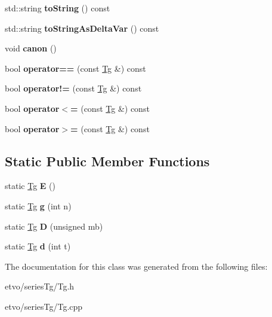\begin{DoxyCompactItemize}
\item 
\mbox{\label{classetvo_i_i_1_1_tg_a056be940039693d2ca1da26bef41edab}} 
std\+::string {\bfseries to\+String} () const
\item 
\mbox{\label{classetvo_i_i_1_1_tg_a8ae7896ab5a4fd55b2581979fd0ba5a6}} 
std\+::string {\bfseries to\+String\+As\+Delta\+Var} () const
\item 
\mbox{\label{classetvo_i_i_1_1_tg_ad65dbfb72f59eb19abf1e185606fab30}} 
void {\bfseries canon} ()
\item 
\mbox{\label{classetvo_i_i_1_1_tg_a9e68ea08fe12077902d71616065a4905}} 
bool {\bfseries operator==} (const \mbox{\hyperlink{classetvo_i_i_1_1_tg}{Tg}} \&) const
\item 
\mbox{\label{classetvo_i_i_1_1_tg_a4bca83b3ff37b22ab84a6715e33e4383}} 
bool {\bfseries operator!=} (const \mbox{\hyperlink{classetvo_i_i_1_1_tg}{Tg}} \&) const
\item 
\mbox{\label{classetvo_i_i_1_1_tg_a39baf99417a03e4d1183a37e099cb504}} 
bool {\bfseries operator$<$=} (const \mbox{\hyperlink{classetvo_i_i_1_1_tg}{Tg}} \&) const
\item 
\mbox{\label{classetvo_i_i_1_1_tg_a556897c515426824b3a99e574179c862}} 
bool {\bfseries operator$>$=} (const \mbox{\hyperlink{classetvo_i_i_1_1_tg}{Tg}} \&) const
\end{DoxyCompactItemize}
\subsection*{Static Public Member Functions}
\begin{DoxyCompactItemize}
\item 
\mbox{\label{classetvo_i_i_1_1_tg_acdeb0254c059e7f140b5fbb3a751eac8}} 
static \mbox{\hyperlink{classetvo_i_i_1_1_tg}{Tg}} {\bfseries E} ()
\item 
\mbox{\label{classetvo_i_i_1_1_tg_a5db928beb3ea725ed6a444d46805c963}} 
static \mbox{\hyperlink{classetvo_i_i_1_1_tg}{Tg}} {\bfseries g} (int n)
\item 
\mbox{\label{classetvo_i_i_1_1_tg_a1907f3a1949c2fd6b75f69f40ff84c56}} 
static \mbox{\hyperlink{classetvo_i_i_1_1_tg}{Tg}} {\bfseries D} (unsigned mb)
\item 
\mbox{\label{classetvo_i_i_1_1_tg_ad8660090e345cfe6eb9f1ca30e6dcd91}} 
static \mbox{\hyperlink{classetvo_i_i_1_1_tg}{Tg}} {\bfseries d} (int t)
\end{DoxyCompactItemize}


The documentation for this class was generated from the following files\+:\begin{DoxyCompactItemize}
\item 
etvo/series\+Tg/Tg.\+h\item 
etvo/series\+Tg/Tg.\+cpp\end{DoxyCompactItemize}
